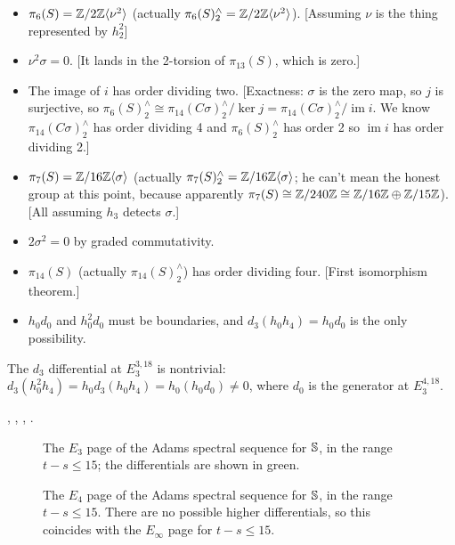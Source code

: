 \documentclass{MetricNotes2023}
\def\bb{\ensuremath\mathbb}
\def\inte{\ensuremath\mathbb{Z}}
\DeclareMathOperator{\im}{im}
\begin{document}
\begin{itemize}
\item \(\pi_6(S)=\inte/2\inte \ang{\nu^2}\) (actually \(\pi_6(S)^\wedge_2=\inte/2\inte \ang{\nu^2}\)). [Assuming \(\nu\) is the thing represented by \(h_2^2\)]
\item \(\nu^2 \sigma=0\). [It lands in the 2-torsion of \(\pi_{13}(S)\), which is zero.]
\item The image of \(i\) has order dividing two. [Exactness: \(\sigma\) is the zero map, so \(j\) is surjective, so \(\pi_6(S)^\wedge_2\cong \pi_{14}(C \sigma)^\wedge_2/\ker j=\pi_{14}(C \sigma)^\wedge_2/\im i\). We know \(\pi_{14}(C \sigma)^\wedge_2\) has order dividing 4 and \(\pi_6(S)^\wedge_2\) has order 2 so \(\im i\) has order dividing 2.]
\item \(\pi_7(S)=\inte/16\inte \ang{\sigma}\) (actually \(\pi_7(S)^\wedge_2=\inte/16\inte \ang{\sigma}\); he can't mean the honest group at this point, because apparently \(\pi_7(S)\cong \inte/240\inte\cong \inte/16\inte \oplus \inte/15\inte\)). [All assuming \(h_3\) detects \(\sigma\).]
\item \(2 \sigma^2=0\) by graded commutativity.
\item \(\pi_{14}(S)\) (actually \(\pi_{14}(S)^\wedge_2\)) has order dividing four. [First isomorphism theorem.]
\item \(h_0d_0\) and \(h_0^2d_0\) must be boundaries, and \(d_3(h_0h_4)=h_0d_0\) is the only possibility.
\end{itemize}

The \(d_3\) differential at \(E_3^{3, 18}\) is nontrivial: \(d_3(h_0^2h_4)=h_0d_3(h_0h_4)=h_0(h_0 d_0)\neq 0\), where \(d_0\) is the generator at \(E_3^{4, 18}\).  

\autocite{stable_homotopy}, \autocite{cobordism}, \autocite{ass}, \autocite{rognes2}.

\begin{figure}[H]
\centering

\caption{The \(E_3\) page of the Adams spectral sequence for \(\bb{S}\), in the range \(t-s\leq 15\); the differentials are shown in green.}
\end{figure}

\begin{figure}[H]
\centering

\caption{The \(E_4\) page of the Adams spectral sequence for \(\bb{S}\), in the range \(t-s\leq 15\). There are no possible higher differentials, so this coincides with the \(E_\infty\) page for \(t-s\leq 15\).}
\end{figure}
\end{document}

